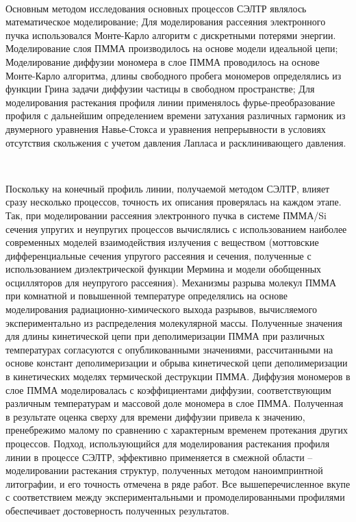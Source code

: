 \methods\

Основным методом исследования основных процессов СЭЛТР являлось математическое моделирование; Для моделирования рассеяния электронного пучка использовался Монте-Карло алгоритм с дискретными потерями энергии. Моделирование слоя ПММА производилось на основе модели идеальной цепи; Моделирование диффузии мономера в слое ПММА проводилось на основе Монте-Карло алгоритма, длины свободного пробега мономеров определялись из функции Грина задачи диффузии частицы в свободном пространстве; Для моделирования растекания профиля линии применялось фурье-преобразование профиля с дальнейшим определением времени затухания различных гармоник из двумерного уравнения Навье-Стокса и уравнения непрерывности в условиях отсутствия скольжения с учетом давления Лапласа и расклинивающего давления.


\probation\

Поскольку на конечный профиль линии, получаемой методом СЭЛТР, влияет сразу несколько процессов, точность их описания проверялась на каждом этапе. Так, при моделировании рассеяния электронного пучка в системе ПММА/Si сечения упругих и неупругих процессов вычислялись с использованием наиболее современных моделей взаимодействия излучения с веществом (моттовские дифференциальные сечения упругого рассеяния и сечения, полученные с использованием диэлектрической функции Мермина и модели обобщенных осцилляторов для неупругого рассеяния). Механизмы разрыва молекул ПММА при комнатной и повышенной температуре определялись на основе моделирования радиационно-химического выхода разрывов, вычисляемого экспериментально из распределения молекулярной массы. Полученные значения для длины кинетической цепи при деполимеризации ПММА при различных температурах согласуются с опубликованными значениями, рассчитанными на основе констант деполимеризации и обрыва кинетической цепи деполимеризации в кинетических моделях термической деструкции ПММА. Диффузия мономеров в слое ПММА моделировалась с коэффициентами диффузии, соответствующим различным температурам и массовой доле мономера в слое ПММА. Полученная в результате оценка сверху для времени диффузии привела к значению, пренебрежимо малому по сравнению с характерным временем протекания других процессов. Подход, использующийся для моделирования растекания профиля линии в процессе СЭЛТР, эффективно применяется в смежной области – моделировании растекания структур, полученных методом наноимпринтной литографии, и его точность отмечена в ряде работ. Все вышеперечисленное вкупе с соответствием между экспериментальными и промоделированными профилями обеспечивает достоверность полученных результатов.

